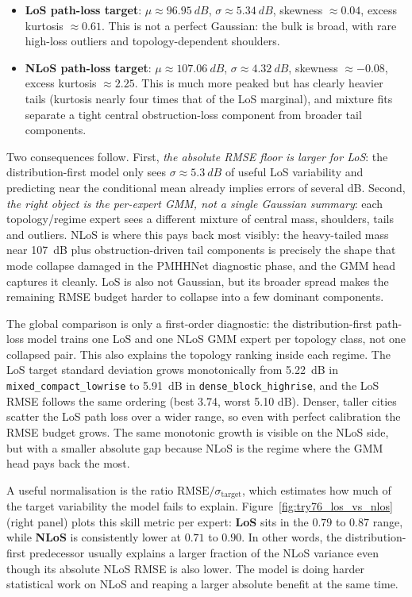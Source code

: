 \begin{itemize}
  \item \textbf{LoS path-loss target}: $\mu \approx \SI{96.95}{dB}$,
  $\sigma \approx \SI{5.34}{dB}$, skewness $\approx 0.04$, excess
  kurtosis $\approx 0.61$. This is not a perfect Gaussian: the bulk is
  broad, with rare high-loss outliers and topology-dependent shoulders.
  \item \textbf{NLoS path-loss target}: $\mu \approx \SI{107.06}{dB}$,
  $\sigma \approx \SI{4.32}{dB}$, skewness $\approx -0.08$, excess
  kurtosis $\approx 2.25$. This is much more peaked but has clearly
  heavier tails (kurtosis nearly four times that of the LoS marginal),
  and mixture fits separate a tight central obstruction-loss component
  from broader tail components.
\end{itemize}

Two consequences follow. First, \emph{the absolute RMSE floor is
larger for LoS}: the distribution-first model only sees $\sigma \approx \SI{5.3}{dB}$ of useful
LoS variability and predicting near the conditional mean already implies
errors of several dB. Second, \emph{the right object is the per-expert
GMM, not a single Gaussian summary}: each topology/regime expert sees a
different mixture of central mass, shoulders, tails and outliers.
NLoS is where this pays back most visibly: the heavy-tailed mass near
\SI{107}{dB} plus obstruction-driven tail components is precisely the
shape that mode collapse damaged in the PMHHNet diagnostic phase, and the GMM head
captures it cleanly. LoS is also not Gaussian, but its broader spread
makes the remaining RMSE budget harder to collapse into a few dominant
components.

The global comparison is only a first-order diagnostic: the distribution-first
path-loss model trains one LoS and one NLoS GMM expert per topology class,
not one collapsed pair. This also explains the topology ranking inside each
regime. The LoS target standard deviation grows
monotonically from \SI{5.22}{dB} in
\texttt{mixed\_compact\_lowrise} to \SI{5.91}{dB} in
\texttt{dense\_block\_highrise}, and the LoS RMSE follows the same
ordering (best 3.74, worst 5.10 dB). Denser, taller cities scatter the
LoS path loss over a wider range, so even with perfect calibration the
RMSE budget grows. The same monotonic growth is visible on the NLoS
side, but with a smaller absolute gap because NLoS is the regime where
the GMM head pays back the most.

A useful normalisation is the ratio
$\mathrm{RMSE}/\sigma_{\text{target}}$, which estimates how much of the
target variability the model fails to explain.
Figure~\ref{fig:try76_los_vs_nlos} (right panel) plots this skill
metric per expert: \textbf{LoS} sits in the
\(0.79\) to \(0.87\) range, while \textbf{NLoS} is consistently lower at
\(0.71\) to \(0.90\). In other words, the distribution-first predecessor usually explains a larger fraction
of the NLoS variance even though its absolute NLoS RMSE is also lower.
The model is doing harder statistical work on NLoS and reaping a larger
absolute benefit at the same time.

